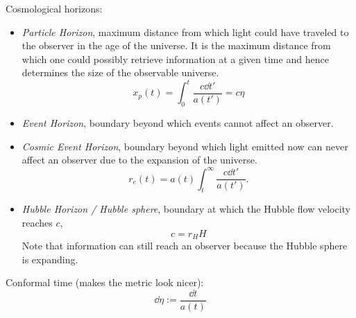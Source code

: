 		\noindent
		Cosmological horizons:
		\begin{itemize}
			\item \emph{Particle Horizon}, maximum distance from which light could have traveled to the observer in the age of the universe. It is the maximum distance from which one could possibly retrieve information at a given time and hence determines the size of the observable universe. 
				\begin{equation}
					x_p(t) = \int_{0}^{t} \frac{c \dd{t'}}{a(t')} = c \eta
				\end{equation}
			\item \emph{Event Horizon}, boundary beyond which events cannot affect an observer.
			\item \emph{Cosmic Event Horizon}, boundary beyond which light emitted now can never affect an observer due to the expansion of the universe.
				\begin{equation}
					r_e(t) = a(t) \int^{\infty}_{t} \frac{c \dd{t'}}{a(t')}.
				\end{equation}
			\item \emph{Hubble Horizon / Hubble sphere}, boundary at which the Hubble flow velocity reaches $c$,
				\begin{equation}
					c = r_H H
				\end{equation}
				Note that information can still reach an observer because the Hubble sphere is expanding.
		\end{itemize}

		\noindent
		Conformal time (makes the metric look nicer):
		\begin{equation}
			\dd \eta := \frac{\dd t}{a(t)}
		\end{equation}

